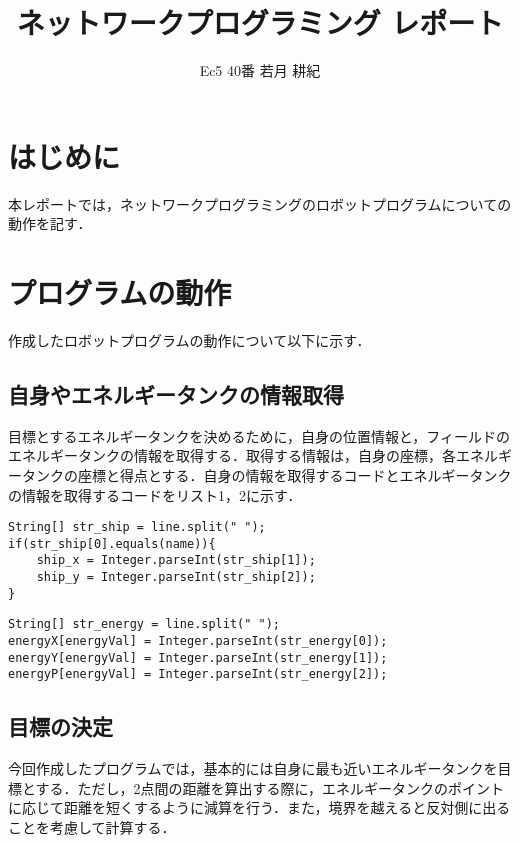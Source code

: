 \documentclass{jsarticle}
\title{\vspace{-3cm}ネットワークプログラミング レポート}
\author{Ec5 40番 若月 耕紀}
\date{}
\begin{document}
\maketitle

\section{はじめに}
本レポートでは，ネットワークプログラミングのロボットプログラムについての動作を記す．

\section{プログラムの動作}
作成したロボットプログラムの動作について以下に示す．

\subsection{自身やエネルギータンクの情報取得}

目標とするエネルギータンクを決めるために，自身の位置情報と，フィールドのエネルギータンクの情報を取得する．取得する情報は，自身の座標，各エネルギータンクの座標と得点とする．自身の情報を取得するコードとエネルギータンクの情報を取得するコードをリスト1，2に示す．

\begin{lstlisting}[caption=自身の情報を取得するコード(一部抜粋)]
String[] str_ship = line.split(" ");
if(str_ship[0].equals(name)){
	ship_x = Integer.parseInt(str_ship[1]);
	ship_y = Integer.parseInt(str_ship[2]);
}
\end{lstlisting}

\begin{lstlisting}[caption=エネルギータンクの情報を取得するコード(一部抜粋)]
String[] str_energy = line.split(" ");
energyX[energyVal] = Integer.parseInt(str_energy[0]);
energyY[energyVal] = Integer.parseInt(str_energy[1]);
energyP[energyVal] = Integer.parseInt(str_energy[2]);
\end{lstlisting}

\subsection{目標の決定}

今回作成したプログラムでは，基本的には自身に最も近いエネルギータンクを目標とする．ただし，2点間の距離を算出する際に，エネルギータンクのポイントに応じて距離を短くするように減算を行う．また，境界を越えると反対側に出ることを考慮して計算する．
\end{document}
